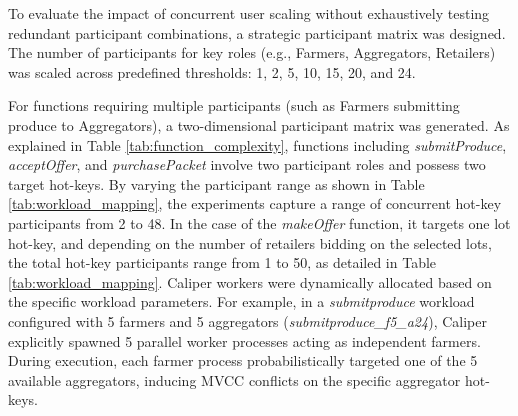 \documentclass[12pt]{article}
\begin{document}
To evaluate the impact of concurrent user scaling without exhaustively testing redundant participant combinations, a strategic participant matrix was designed. The number of participants for key roles (e.g., Farmers, Aggregators, Retailers) was scaled across predefined thresholds: 1, 2, 5, 10, 15, 20, and 24. 

For functions requiring multiple participants (such as Farmers submitting produce to Aggregators), a two-dimensional participant matrix was generated. As explained in Table \ref{tab:function_complexity}, functions including \textit{submitProduce}, \textit{acceptOffer}, and \textit{purchasePacket} involve two participant roles and possess two target hot-keys. By varying the participant range as shown in Table \ref{tab:workload_mapping}, the experiments capture a range of concurrent hot-key participants from 2 to 48. In the case of the \textit{makeOffer} function, it targets one lot hot-key, and depending on the number of retailers bidding on the selected lots, the total hot-key participants range from 1 to 50, as detailed in Table \ref{tab:workload_mapping}.
Caliper workers were dynamically allocated based on the specific workload parameters. For example, in a \textit{submitproduce} workload configured with 5 farmers and 5 aggregators (\textit{submitproduce\_f5\_a24}), Caliper explicitly spawned 5 parallel worker processes acting as independent farmers. During execution, each farmer process probabilistically targeted one of the 5 available aggregators, inducing MVCC conflicts on the specific aggregator hot-keys.

\begin{table}[ht]
\centering
\caption{Benchmark Workload Configurations and Participant Mapping}
\label{tab:workload_mapping}
\end{table}
\end{document}

